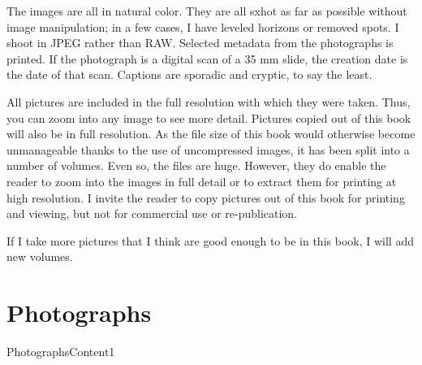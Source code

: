 \documentclass[10pt,letter,oneside]{book}
\begin{document}
The images are all in natural color. They are all sxhot as far as possible without image manipulation; in a few cases, I have leveled horizons or removed spots. I shoot in JPEG rather than RAW. Selected metadata from the photographs is printed. If the photograph is a digital scan of a 35 mm slide, the creation date is the date of that scan. Captions are sporadic and cryptic, to say the least.

All pictures are included in the full resolution with which they were taken. Thus, you can zoom into any image to see more detail. Pictures copied out of this book will also be in full resolution. As the file size of this book would otherwise become unmanageable thanks to the use of uncompressed images, it has been split into a number of volumes. Even so, the files are huge. However, they do enable the reader to zoom into the images in full detail or to extract them for printing at high resolution. I invite the reader to copy pictures out of this book for printing and viewing, but not for commercial use or re-publication. 

If I take more pictures that I think are good enough to be in this book, I will add new volumes.

\chapter{Photographs}

 {PhotographsContent1}
\end{document}

